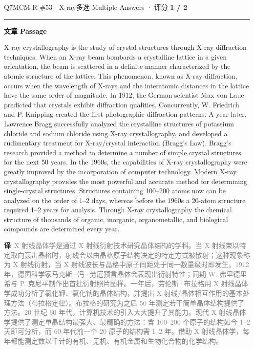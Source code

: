 \documentclass[11pt]{article}
\newcommand{\ptesub}[1]{%
  \par\needspace{2\baselineskip}\smallskip
  {\color{cAccent}\rule[-0.2ex]{3pt}{1.05em}}\hspace{6pt}%
  {\bfseries\color{cHead}#1}\par\nopagebreak\smallskip}
\newcommand{\zh}[1]{{\footnotesize\textcolor{cNote}{\textbf{译}}\ \textcolor{gray}{#1}}}
\begin{document}
\begin{qblock}{Q7\quad MCM-R \#53\ \ X-ray}{多选 Multiple Answers · 评分 \textcolor{cAccent}{\bfseries 1 / 2}}
\ptesub{文章 Passage}
\begin{promptbox}
X-ray crystallography is the study of crystal structures through X-ray diffraction techniques. When an X-ray beam bombards a crystalline lattice in a given orientation, the beam is scattered in a definite manner characterized by the atomic structure of the lattice. This phenomenon, known as X-ray diffraction, occurs when the wavelength of X-rays and the interatomic distances in the lattice have the same order of magnitude. In 1912, the German scientist Max von Laue predicted that crystals exhibit diffraction qualities. Concurrently, W. Friedrich and P. Knipping created the first photographic diffraction patterns. A year later, Lawrence Bragg successfully analyzed the crystalline structures of potassium chloride and sodium chloride using X-ray crystallography, and developed a rudimentary treatment for X-ray/crystal interaction (Bragg's Law). Bragg's research provided a method to determine a number of simple crystal structures for the next 50 years. In the 1960s, the capabilities of X-ray crystallography were greatly improved by the incorporation of computer technology. Modern X-ray crystallography provides the most powerful and accurate method for determining single-crystal structures. Structures containing 100--200 atoms now can be analyzed on the order of 1--2 days, whereas before the 1960s a 20-atom structure required 1--2 years for analysis. Through X-ray crystallography the chemical structure of thousands of organic, inorganic, organometallic, and biological compounds are determined every year.
\end{promptbox}
\zh{X 射线晶体学是通过 X 射线衍射技术研究晶体结构的学科。当 X 射线束以特定取向轰击晶格时，射线会以由晶格原子结构决定的特定方式被散射；这种现象称为 X 射线衍射，当 X 射线波长与晶格中原子间距处于同一数量级时即发生。1912 年，德国科学家马克斯·冯·劳厄预言晶体会表现出衍射特性；同期 W. 弗里德里希与 P. 克尼平制作出首批衍射照片图样。一年后，劳伦斯·布拉格用 X 射线晶体学成功分析了氯化钾、氯化钠的晶体结构，并提出 X 射线/晶体相互作用的基本处理方法（布拉格定律）。布拉格的研究为之后 50 年测定若干简单晶体结构提供了方法。20 世纪 60 年代，计算机技术的引入大大提升了其能力。现代 X 射线晶体学提供了测定单晶结构最强大、最精确的方法：含 100–200 个原子的结构如今 1–2 天即可分析，而 60 年代前一个 20 原子的结构需 1–2 年。借助 X 射线晶体学，每年都能测定数以千计的有机、无机、有机金属和生物化合物的化学结构。}

\end{qblock}
\end{document}
